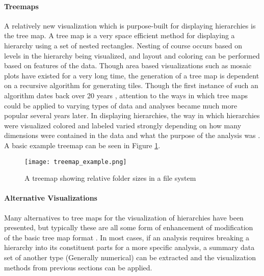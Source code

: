 \paragraph{Treemaps}
A relatively new visualization which is purpose-built for displaying hierarchies is the tree map. A tree map is a very space efficient method for displaying a hierarchy using a set of nested rectangles. Nesting of course occurs based on levels in the hierarchy being visualized, and layout and coloring can be performed based on features of the data. Though area based visualizations such as mosaic plots have existed for a very long time, the generation of a tree map is dependent on a recursive algorithm for generating tiles. Though the first instance of such an algorithm dates back over 20 years \citep{Shneiderman1992}, attention to the ways in which tree maps could be applied to varying types of data and analyses became much more popular several years later. In displaying hierarchies, the way in which hierarchies were visualized colored and labeled varied strongly depending on how many dimensions were contained in the data and what the purpose of the analysis was \citep{Bederson2002}\citep{Schreck2006}. A basic example treemap can be seen in Figure \ref{fig:treemap_ex}.

\begin{figure}
	\centering
	\texttt{[image: treemap\_example.png]}
	\caption{A treemap showing relative folder sizes in a file system \citep{Fry2008}}
	\label{fig:treemap_ex}
\end{figure}

\paragraph{Alternative Visualizations}
Many alternatives to tree maps for the visualization of hierarchies have been presented, but typically these are all some form of enhancement of modification of the basic tree map format \citep{Slingsby2009}. In most cases, if an analysis requires breaking a hierarchy into its constituent parts for a more specific analysis, a summary data set of another type (Generally numerical) can be extracted and the visualization methods from previous sections can be applied.
   



